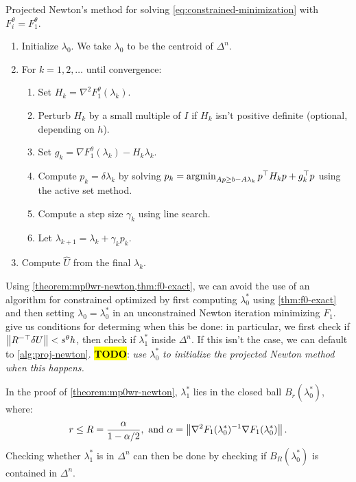 \documentclass[eikonal.tex]{subfiles}
\begin{document}
\begin{algorithm}[H]
  \caption{Projected Newton's method for solving
    \cref{eq:constrained-minimization} with
    $F_i^\theta = F_1^\theta$.}\label{alg:proj-newton}
  \begin{enumerate}[nolistsep]
  \item Initialize $\lambda_0$. We take $\lambda_0$ to be the centroid
    of $\Delta^n$.
  \item For $k = 1, 2, \hdots$ until convergence:
    \begin{enumerate}
    \item Set $H_k = \nabla^2 F_1^\theta(\lambda_k)$.
    \item Perturb $H_k$ by a small multiple of $I$ if $H_k$ isn't
      positive definite (optional, depending on $h$).
    \item Set $g_k = \nabla F_1^\theta(\lambda_k) - H_k \lambda_k$.
    \item Compute $p_k = \delta \lambda_k$ by solving
      $p_k = \operatorname{argmin}_{Ap \geq b - A\lambda_k} p^\top H_k p + g_k^\top
      p$ using the active set method.
    \item Compute a step size $\gamma_k$ using line search.
    \item Let $\lambda_{k + 1} = \lambda_k + \gamma_k p_k$.
    \end{enumerate}
  \item Compute $\hat{U}$ from the final $\lambda_k$.
  \end{enumerate}
\end{algorithm}

Using \cref{theorem:mp0wr-newton,thm:f0-exact}, we can avoid the use
of an algorithm for constrained optimized by first computing
$\lambda_0^*$ using \cref{thm:f0-exact} and then setting
$\lambda_0 = \lambda_0^*$ in an unconstrained Newton iteration
minimizing $F_1$.  give us
conditions for determing when this be done: in particular, we first
check if $\left\|R^{-\top} \delta U\right\| < s^\theta h$, then check if
$\lambda_1^*$ inside $\Delta^n$. If this isn't the case, we can
default to \cref{alg:proj-newton}. \hl{\textbf{TODO}}: \emph{use
  $\lambda_0^*$ to initialize the projected Newton method when this
  happens.}

In the proof of \cref{theorem:mp0wr-newton}, $\lambda_1^*$ lies in the
closed ball $B_r(\lambda_0^*)$, where:
\begin{equation}
  r \leq R = \frac{\alpha}{1 - \alpha/2}, \mbox{ and } \alpha = \left\|\nabla^2 F_1(\lambda_0^*)^{-1} \nabla F_1(\lambda_0^*)\right\|.
\end{equation}
Checking whether $\lambda_1^*$ is in $\Delta^n$ can then be done by
checking if $B_R(\lambda_0^*)$ is contained in $\Delta^n$.
\end{document}
